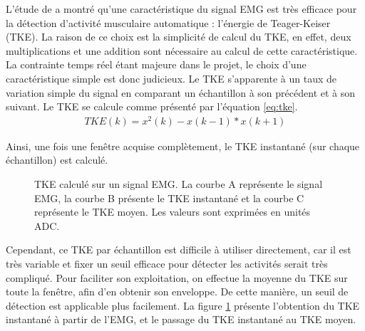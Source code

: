 \documentclass[letterpaper, twoside, 12pt, memoire, creativecommons, hyperref]{thETS}
\begin{document}
L'étude de \cite{li2007} a montré qu'une caractéristique du signal EMG est très efficace pour la détection d'activité musculaire automatique : l'énergie de Teager-Keiser (TKE). La raison de ce choix est la simplicité de calcul du TKE, en effet, deux multiplications et une addition sont nécessaire au calcul de cette caractéristique. La contrainte temps réel étant majeure dans le projet, le choix d'une caractéristique simple est donc judicieux. Le TKE s'apparente à un taux de variation simple du signal en comparant un échantillon à son précédent et à son suivant. Le TKE se calcule comme présenté par l'équation \ref{eq:tke}.
\begin{align}\label{eq:tke}
   TKE(k) = x^2(k) - x(k-1)*x(k+1) 
\end{align}

Ainsi, une fois une fenêtre acquise complètement, le TKE instantané (sur chaque échantillon) est calculé. 

\begin{figure}
	\centering
	\caption{TKE calculé sur un signal EMG. La courbe A représente le signal EMG, la courbe B présente le TKE instantané et la courbe C représente le TKE moyen. Les valeurs sont exprimées en unités ADC.}
	\label{fig:tkeinstant}
\end{figure}

Cependant, ce TKE par échantillon est difficile à utiliser directement, car il est très variable et fixer un seuil efficace pour détecter les activités serait très compliqué. Pour faciliter son exploitation, on effectue la moyenne du TKE sur toute la fenêtre, afin d'en obtenir son enveloppe. De cette manière, un seuil de détection est applicable plus facilement. La figure \ref{fig:tkeinstant} présente l'obtention du TKE instantané à partir de l'EMG, et le passage du TKE instantané au TKE moyen.
\end{document}
